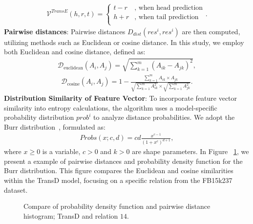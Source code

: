 \documentclass{article}
\begin{document}
\begin{align}
\label{eq:PreV}
    \mathcal{V}^{TransE}(h, r, t) = \begin{cases}
            t-r & \text{, when head prediction} \\
            h+r & \text{, when tail prediction} \\
        \end{cases}.
\end{align}%
\textbf{Pairwise distances}: Pairwise distances $D_{\mathit{dist}}(res^{i}, res^{i})$ are then computed, utilizing methods such as Euclidean or cosine distance. In this study, we employ both Euclidean and cosine distance, defined as:
\begin{align}
\label{eq:DistEu}
    \mathcal{D}_{\text{euclidean}}(A_i, A_j) = \sqrt{\sum_{k=1}^{m}(A_{ik} - A_{jk})^2},
\end{align}%
\begin{align}
\label{eq:DistLogit}
    \mathcal{D}_{\text{cosine}}(A_i, A_j) = 1 - \frac{\sum_{k=1}^{m}A_{ik} \times A_{jk}}{\sqrt{\sum_{k=1}^{m}A_{ik}^2} \times \sqrt{\sum_{k=1}^{m}A_{jk}^2}}.
\end{align}%
\textbf{Distribution Similarity of Feature Vector}:
To incorporate feature vector similarity into entropy calculations, the algorithm uses a model-specific probability distribution  $prob^i$  to analyze distance probabilities. We adopt the Burr distribution~\cite{burr1942cumulative}, formulated as:  
\begin{align}
\label{eq:PDF}
    Probs(x; c, d) = cd \frac{x^{c-1}}{(1 + x^c)^{d+1}},        
\end{align}%
where $x \geq 0$ is a variable, $c > 0$ and $k > 0$ are shape parameters. In Figure ~\ref{fig:pdfhist}, we present a example of pairwise distances and probability density function for the Burr distribution. This figure compares the Euclidean and cosine similarities within the TransD model, focusing on a specific relation from the FB15k237 dataset. 
\bgroup
\begin{figure}[b!]
  \centering \makeatletter{}
  \makeatother
  \caption{{Compare of probability density function and pairwise distance histogram; TransD and relation $14$.}}
  \label{fig:pdfhist}
  \hfill
\end{figure}
\end{document}
